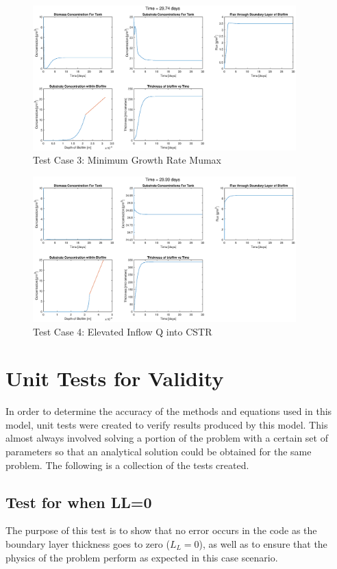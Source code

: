 \documentclass[letterpaper, twoside]{article}
\numberwithin{equation}{section}
\begin{document}
\begin{figure}[H]
  \centering
  \includegraphics[read=eps, width=4in]{Testcase3_figure.eps}
  \caption{Test Case 3: Minimum Growth Rate Mumax}
\end{figure}

\begin{figure}[H]
  \centering
  \includegraphics[read=eps, width=4in]{Testcase4_figure.eps}
  \caption{Test Case 4: Elevated Inflow Q into CSTR}
\end{figure}

\section{Unit Tests for Validity}
In order to determine the accuracy of the methods and equations used in this model, unit tests were created to verify results produced by this model. This almost always involved solving a portion of the problem with a certain set of parameters so that an analytical solution could be obtained for the same problem. The following is a collection of the tests created.

\subsection{Test for when LL=0}
The purpose of this test is to show that no error occurs in the code as the boundary layer thickness goes to zero ($L_L=0$), as well as to ensure that the physics of the problem perform as expected in this case scenario.
\end{document}
